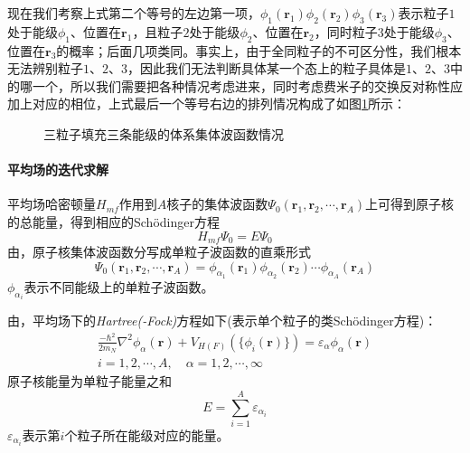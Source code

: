 现在我们考察上式第二个等号的左边第一项，$\phi_1(\bm{r}_1)\phi_2(\bm{r}_2)\phi_3(\bm{r}_3)$表示粒子$1$处于能级$\phi_1$、位置在$\bm{r}_1$，且粒子$2$处于能级$\phi_2$、位置在$\bm{r}_2$，同时粒子$3$处于能级$\phi_3$、位置在$\bm{r}_3$的概率；后面几项类同。事实上，由于全同粒子的不可区分性，我们根本无法辨别粒子$1$、$2$、$3$，因此我们无法判断具体某一个态上的粒子具体是$1$、$2$、$3$中的哪一个，所以我们需要把各种情况考虑进来，同时考虑费米子的交换反对称性应加上对应的相位，上式最后一个等号右边的排列情况构成了如图\ref{fig:three-body-wv}所示：
\begin{figure}[htbp]
	\centering
	
	\caption{三粒子填充三条能级的体系集体波函数情况}
	\label{fig:three-body-wv}
\end{figure}

\paragraph*{平均场的迭代求解}
平均场哈密顿量$H_{mf}$作用到$A$核子的集体波函数$\Psi_0(\bm{r}_1, \bm{r}_2, \cdots, \bm{r}_A)$上可得到原子核的总能量，得到相应的Sch{\"o}dinger方程
\begin{equation}
	H_{mf} \Psi_0 = E \Psi_0
	\label{eq:mf-scho-eq}
\end{equation}
由，原子核集体波函数分写成单粒子波函数的直乘形式
\begin{equation}
	\Psi_0(\bm{r}_1, \bm{r}_2, \cdots, \bm{r}_A) = \phi_{\alpha_1}(\bm{r}_1) \phi_{\alpha_2}(\bm{r}_2) \cdots \phi_{\alpha_A}(\bm{r}_A)
	\label{def:collect-wv}
\end{equation}
$\phi_{\alpha_{i}}$表示不同能级上的单粒子波函数。

由，平均场下的\textsl{Hartree(-Fock)}方程如下(表示单个粒子的类Sch{\"o}dinger方程)：
\begin{equation}
    \begin{aligned}
        \frac{-\hbar^{2}}{2m_N} \nabla^{2} \phi_{\alpha}(\bm{r}) + V_{H(F)}\left(
        \{\phi_{i}(\bm{r})\}\right) = \varepsilon_{\alpha}\phi_{\alpha}(\bm{r}) \\ 
        i = 1, 2, \cdots, A, \quad \alpha = 1, 2, \cdots, \infty
    \end{aligned}
    \label{eq:Hartree-Fock}
\end{equation}
原子核能量为单粒子能量之和
\begin{equation}
	E = \sum_{i = 1}^{A} \varepsilon_{\alpha_i}
\end{equation}
$\varepsilon_{\alpha_i}$表示第$i$个粒子所在能级对应的能量。

